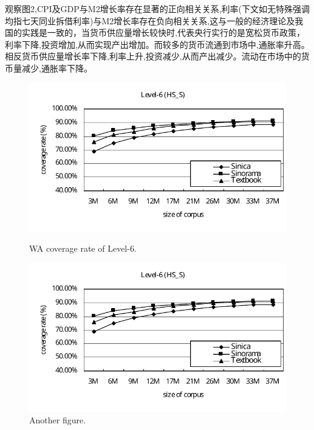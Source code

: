 \documentclass{ijclclp}
\begin{document}
观察图2,CPI及GDP与M2增长率存在显著的正向相关关系,利率(下文如无特殊强调均指七天同业拆借利率)与M2增长率存在负向相关关系,这与一般的经济理论及我国的实践是一致的，当货币供应量增长较快时,代表央行实行的是宽松货币政策，利率下降,投资增加,从而实现产出增加。而较多的货币流通到市场中,通胀率升高。相反货币供应量增长率下降,利率上升,投资减少,从而产出减少。流动在市场中的货币量减少,通胀率下降。
\begin{figure}[h]
    \centering
    \begin{minipage}{0.45\textwidth}
        \centering
        \includegraphics[width=\textwidth]{img/图1.pdf}
        \caption{WA coverage rate of Level-6.}
        \label{fig:figure1}
    \end{minipage}
    \hfill
    \begin{minipage}{0.45\textwidth}
        \centering
        \includegraphics[width=\textwidth]{img/图2.pdf}
        \caption{Another figure.}
        \label{fig:figure2}
    \end{minipage}
\end{figure}
\end{document}
